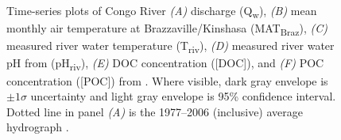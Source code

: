 \begin{figure}[p]
	\caption[Environmental parameter time-series plots]{Time-series plots of Congo River \textit{(A)} discharge (Q\textsubscript{w}), \textit{(B)} mean monthly air temperature at Brazzaville/Kinshasa (MAT\textsubscript{Braz}), \textit{(C)} measured river water temperature (T\textsubscript{riv}), \textit{(D)} measured river water pH from \citet{Wang:2013js} (pH\textsubscript{riv}), \textit{(E)} DOC concentration ([DOC]), and \textit{(F)} POC concentration ([POC]) from \citet{Hemingway:2016bq}. Where visible, dark gray envelope is $\pm 1 \sigma$ uncertainty and light gray envelope is 95\% confidence interval. Dotted line in panel \textit{(A)} is the 1977--2006 (inclusive) average hydrograph \citep{Spencer:2012en}.}
	\label{Ch5Fig:2} 
\end{figure}

